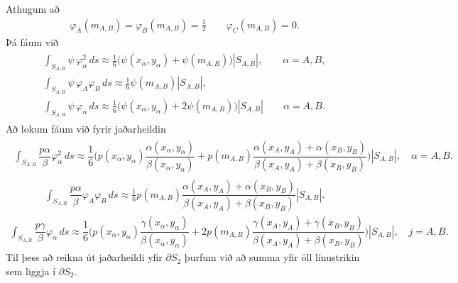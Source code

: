 \documentclass[a4paper,10pt,icelandic]{sphinxmanual}
\begin{document}
Athugum að
\begin{equation*}
\begin{split}\varphi_A(m_{A,B})=\varphi_B(m_{A,B})=\tfrac 12\qquad
\varphi_C(m_{A,B})=0.\end{split}
\end{equation*}
Þá fáum við
\begin{equation*}
\begin{split}\begin{gathered}
\int_{S_{A,B}} \psi\,
\varphi_\alpha^2\, ds
\approx \tfrac 16\big(\psi(x_\alpha,y_\alpha)+ \psi(m_{A,B})\big)
|S_{A,B}|,  \qquad \alpha=A,B,
\\
\int_{S_{A,B}} \psi\,
\varphi_A\varphi_B\, ds
\approx \tfrac 16 \psi(m_{A,B}) |S_{A,B}|, \\
\int_{S_{A,B}} \psi \,
\varphi_\alpha\, ds
\approx \tfrac 16\big(\psi(x_\alpha,y_\alpha)+2\psi(m_{A,B})\big) |S_{A,B}|
\qquad \alpha=A,B.\end{gathered}\end{split}
\end{equation*}
Að lokum fáum við fyrir jaðarheildin
\begin{equation*}
\begin{split}\begin{gathered}
\int_{S_{A,B}}\dfrac{p \alpha}{\beta}
\varphi_\alpha^2\, ds
\approx \dfrac 16\bigg(
p(x_\alpha,y_\alpha)
\dfrac{\alpha(x_\alpha,y_\alpha)}
{\beta(x_\alpha,y_\alpha)}
+p(m_{A,B})
\dfrac{\alpha(x_A,y_A)+\alpha(x_B,y_B)}
{\beta(x_A,y_A)+\beta(x_B,y_B)}
\bigg) |S_{A,B}|, \quad \alpha=A,B.
\end{gathered}\end{split}
\end{equation*}\begin{equation*}
\begin{split}\int_{S_{A,B}}\dfrac{p \alpha}{ \beta}
\varphi_A\varphi_B\, ds
\approx \frac 16
p(m_{A,B}) \dfrac{\alpha(x_A,y_A)+\alpha(x_B,y_B)}
{\beta(x_A,y_A)+\beta(x_B,y_B)} |S_{A,B}|.\end{split}
\end{equation*}\begin{equation*}
\begin{split}\int_{S_{A,B}}\dfrac{p \gamma}{\beta}
\varphi_\alpha\, ds
\approx \dfrac 16\bigg(
p(x_\alpha,y_\alpha)
\dfrac{\gamma(x_\alpha,y_\alpha)}
{\beta(x_\alpha,y_\alpha)}
+2
p(m_{A,B})
\dfrac{\gamma(x_A,y_A)+\gamma(x_B,y_B)}
{\beta(x_A,y_A)+\beta(x_B,y_B)}
\bigg) |S_{A,B}|, \quad j=A,B.\end{split}
\end{equation*}
Til þess að reikna út jaðarheildi yfir \(\partial S_2\) þurfum við að summa yfir öll línustrikin sem liggja í \(\partial S_2\).
\end{document}
